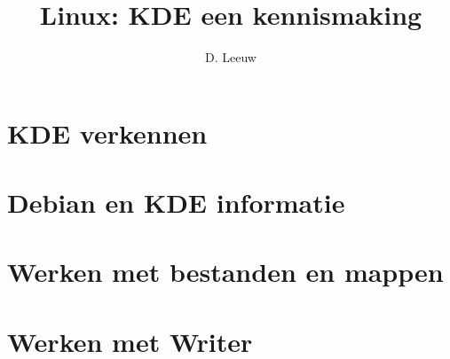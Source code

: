 \documentclass[a4paper,12pt,twoside,openright,titlepage]{article}
\author{D. Leeuw}
\title{Linux: KDE een kennismaking}
\date{\today\\
\vfill
\raggedright
\copyright\ 2026 Dennis Leeuw\\
}
\begin{document}

\maketitle


%
%



\section{KDE verkennen}


\section{Debian en KDE informatie}


\section{Werken met bestanden en mappen}


\section{Werken met Writer}



\printindex
\end{document}
